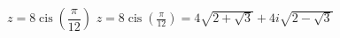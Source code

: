{ $z = 8\operatorname{cis}\left(\dfrac{\pi}{12}\right)$ }
{ $z = 8\operatorname{cis}\left(\frac{\pi}{12}\right) = 4\sqrt{2+\sqrt{3}}+4i\sqrt{2-\sqrt{3}}$ }
